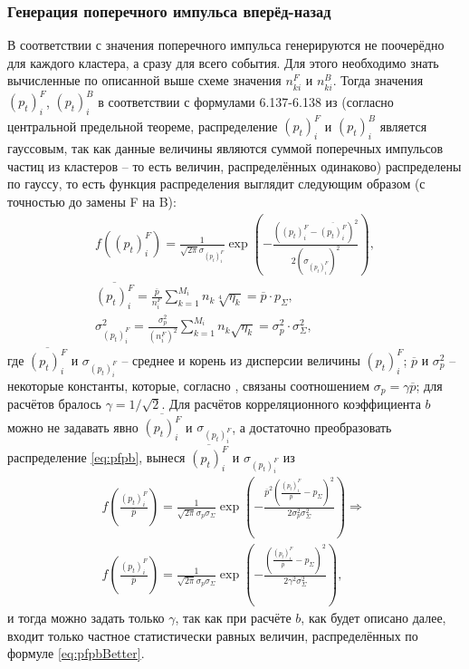 \subsubsection{Генерация поперечного импульса вперёд-назад}
В соответствии с \cite{dissert} значения поперечного импульса генерируются не поочерёдно для каждого кластера, а сразу для всего события. 
Для этого необходимо знать вычисленные по описанной выше схеме значения $n^F_{ki}$ и $n^B_{ki}$. 
Тогда значения $(p_t)_i^F$, $(p_t)_i^B$ в соответствии с формулами 6.137-6.138 из \cite{dissert} (согласно центральной предельной теореме, распределение $(p_t)_i^F$ и $(p_t)_i^B$ является гауссовым, так как данные величины являются суммой поперечных импульсов частиц из кластеров -- то есть величин, распределённых одинаково) распределены по гауссу, то есть функция распределения выглядит следующим образом (с точностью до замены F на B):
\begin{equation} \label{eq:pfpb}
\begin{split}
	f((p_t)_i^F) = \frac{1}{\sqrt{2\pi} \sigma_{(p_t)_i^F}} \exp{\left( - \frac{((p_t)_i^F - \overline{(p_t)_i^F})^2}{2(\sigma_{(p_t)_i^F})^2} \right)}, \\
	\overline{(p_t)_i^F} = \frac{\overline{p}}{n_i^F} \sum_{k = 1}^{M_i} n_k \sqrt[4]{\eta_k} = \overline{p} \cdot p_\Sigma, \qquad \quad \quad \\
	\sigma_{(p_t)_i^F}^2 = \frac{\sigma_p^2}{(n_i^F)^2} \sum_{k = 1}^{M_i} n_k \sqrt{\eta_k} = \sigma_p^2 \cdot \sigma_\Sigma^2, \quad \quad \quad
\end{split}
\end{equation}
где $\overline{(p_t)_i^F}$ и $\sigma_{(p_t)_i^F}$ -- среднее и корень из дисперсии величины $(p_t)_i^F$; $\overline{p}$ и $\sigma_p^2$ -- некоторые константы, которые, согласно \cite{dissert}, связаны соотношением $\sigma_p = \gamma \overline{p}$; для расчётов бралось $\gamma = 1/\sqrt{2}$. 
Для расчётов корреляционного коэффициента $b$ можно не задавать явно $\overline{(p_t)_i^F}$ и $\sigma_{(p_t)_i^F}$, а достаточно преобразовать распределение \ref{eq:pfpb}, вынеся $\overline{(p_t)_i^F}$ и $\sigma_{(p_t)_i^F}$ из 
\begin{equation} \label{eq:pfpbBetter}
\begin{split}
	f \left( \frac{ (p_t)_i^F } { \overline{p} } \right) = \frac{1}{\sqrt{2 \pi} \sigma_p \sigma_\Sigma} \exp{ \left( - \frac{ \overline{p}^2 \left( \frac{ (p_t)_i^F }{ \overline{p} } - p_\Sigma \right)^2} { 2 \sigma_p^2 \sigma_\Sigma^2 } \right) } \Longrightarrow \\
	f \left( \frac{ (p_t)_i^F } { \overline{p} } \right) = \frac{1}{\sqrt{2 \pi} \sigma_p \sigma_\Sigma} \exp{ \left( - \frac{ \left( \frac{ (p_t)_i^F }{ \overline{p} } - p_\Sigma \right)^2} { 2 \gamma^2 \sigma_\Sigma^2 } \right) }, \quad \enspace \enspace
\end{split}
\end{equation}
и тогда можно задать только $\gamma$, так как при расчёте $b$, как будет описано далее, входит только частное статистически равных величин, распределённых по формуле \ref{eq:pfpbBetter}.
